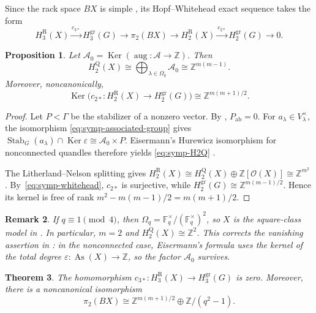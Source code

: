 \documentclass[11pt]{article}
\newtheorem{theorem}{Theorem}[section]
\newtheorem{proposition}[theorem]{Proposition}
\newtheorem{remark}[theorem]{Remark}
\DeclareMathOperator{\As}{As}
\DeclareMathOperator{\Stab}{Stab}
\DeclareMathOperator{\Ker}{Ker}
\newcommand{\ZZ}{\mathbb Z}
\newcommand{\OO}{\mathcal O}
\newcommand{\gr}{\mathrm{gr}}
\newcommand{\R}{\mathrm R}
\newcommand{\Q}{\mathrm Q}
\newcommand{\ab}{\mathrm{ab}}
\begin{document}
Since the rack space $BX$ is simple
\cite[Proposition~5.2]{FRS}, its Hopf--Whitehead exact sequence takes the form
\cite[\S6.1]{NosakaHomotopical}
\begin{equation}
 H_3^\R(X)\xrightarrow{c_{3*}}H_3^{\gr}(G)
 \longrightarrow\pi_2(BX)
 \longrightarrow H_2^\R(X)\xrightarrow{c_{2*}}H_2^{\gr}(G)
 \longrightarrow0.
\label{eq:symp-whitehead}
\end{equation}

\begin{proposition}
\label{prop:symp-H2-kernels}
Let $\mathcal A_0=\Ker(\operatorname{aug}\colon\mathcal A\to\ZZ)$. Then
\begin{equation}
 H_2^\Q(X)
 \cong\bigoplus_{\lambda\in\Omega_q}\mathcal A_0
 \cong\ZZ^{m(m-1)}.
\label{eq:symp-H2Q}
\end{equation}
Moreover, noncanonically,
\[
 \Ker\bigl(c_{2*}\colon H_2^\R(X)\longrightarrow H_2^{\gr}(G)\bigr)
 \cong\ZZ^{m(m+1)/2}.
\]
\end{proposition}

\begin{proof}
Let $P<\Gamma$ be the stabilizer of a nonzero vector. By
\cite[Lemma~4.8]{NosakaAdjoint}, $P_{\ab}=0$. For
$a_\lambda\in V_\lambda^\times$, the isomorphism
\eqref{eq:symp-associated-group} gives
$\Stab_G(a_\lambda)\cap\Ker\varepsilon\cong\mathcal A_0\times P$.
Eisermann's Hurewicz isomorphism for nonconnected quandles therefore yields
\eqref{eq:symp-H2Q}
\cite[Definition~7.13 and Theorem~9.9]{Eisermann}.

The Litherland--Nelson splitting gives
$H_2^\R(X)\cong H_2^\Q(X)\oplus\ZZ[\OO(X)]\cong\ZZ^{m^2}$
\cite[Theorem~2.2]{LitherlandNelson}. By~\eqref{eq:symp-whitehead}, $c_{2*}$
is surjective, while
$H_2^{\gr}(G)\cong\ZZ^{m(m-1)/2}$. Hence its kernel is free of rank
$m^2-m(m-1)/2=m(m+1)/2$.
\end{proof}

\begin{remark}
\label{rem:comparison-nosaka-H2}
If $q\equiv1\pmod4$, then
$\Omega_q=\mathbb F_q^\times/(\mathbb F_q^\times)^2$, so $X$ is the
square-class model in \cite[\S4.2]{NosakaAdjoint}. In particular, $m=2$ and
$H_2^\Q(X)\cong\ZZ^2$. This corrects the vanishing assertion in
\cite[Proposition~4.7]{NosakaAdjoint}: in the nonconnected case,
Eisermann's formula uses the kernel of the total degree
$\varepsilon\colon\As(X)\to\ZZ$, so the factor $\mathcal A_0$ survives.
\end{remark}

\begin{theorem}
\label{thm:symp-pi2}
The homomorphism
$c_{3*}\colon H_3^\R(X)\to H_3^{\gr}(G)$ is zero. Moreover, there is a
noncanonical isomorphism
\[
 \pi_2(BX)\cong
 \ZZ^{m(m+1)/2}\oplus\ZZ/(q^2-1).
\]
\end{theorem}
\end{document}
